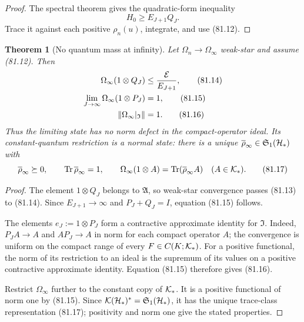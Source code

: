 \documentclass[11pt]{article}
\newtheorem{theorem}{Theorem}[section]
\theoremstyle{remark}
\begin{document}
\begin{proof}
The spectral theorem gives the quadratic-form inequality
\[
                              H_0\geq E_{J+1}Q_J.
\]
Trace it against each positive \(\rho_n(u)\), integrate, and use
(81.12).
\end{proof}

\begin{theorem}[No quantum mass at infinity]
\label{thm:v12v81-no-escape}
Let \(\Omega_n\to\Omega_\infty\) weak-star and assume (81.12).
Then
\begin{align}
 \Omega_\infty(1\otimes Q_J)
 &\leq{{\cal E}\over E_{J+1}},                              \tag{81.14}\\
 \lim_{J\to\infty}\Omega_\infty(1\otimes P_J)&=1,            \tag{81.15}\\
 \|\Omega_\infty|_{\mathfrak I}\|&=1.                       \tag{81.16}
\end{align}
Thus the limiting state has no norm defect in the
compact-operator ideal.  Its constant-quantum restriction is a
normal state: there is a unique
\(\overline\rho_\infty\in{\mathfrak S}_1({\cal H}_*)\) with
\[
 \overline\rho_\infty\succeq0,\qquad
 \operatorname{Tr}\overline\rho_\infty=1,\qquad
 \Omega_\infty(1\otimes A)
 =\operatorname{Tr}(\overline\rho_\infty A)
 \quad(A\in{\cal K}_*).                                     \tag{81.17}
\]
\end{theorem}

\begin{proof}
The element \(1\otimes Q_J\) belongs to \({\mathfrak A}\), so
weak-star convergence passes (81.13) to (81.14).  Since
\(E_{J+1}\to\infty\) and
\(P_J+Q_J=I\), equation (81.15) follows.

The elements \(e_J:=1\otimes P_J\) form a contractive approximate
identity for \({\mathfrak I}\).  Indeed, \(P_JA\to A\) and
\(AP_J\to A\) in norm for each compact operator \(A\); the convergence
is uniform on the compact range of every
\(F\in C(K;{\cal K}_*)\).  For a positive functional, the norm of its
restriction to an ideal is the supremum of its values on a positive
contractive approximate identity.  Equation (81.15) therefore gives
(81.16).

Restrict \(\Omega_\infty\) further to the constant copy of
\({\cal K}_*\).  It is a positive functional of norm one by
(81.15).  Since
\({\cal K}({\cal H}_*)^*={\mathfrak S}_1({\cal H}_*)\), it has the
unique trace-class representation (81.17); positivity and norm one
give the stated properties.
\end{proof}
\end{document}
